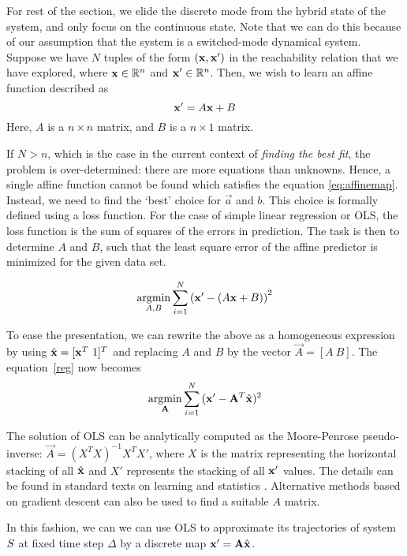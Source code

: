 For rest of the section, we elide the discrete mode from the hybrid
state of the system, and only focus on the continuous state. Note that
we can do this because of our assumption that the system is a
switched-mode dynamical system.  Suppose we have $N$ tuples of the
form $(\mathbf{x},\mathbf{x}')$ in the reachability relation that we have explored,
where $\mathbf{x}\in\mathbb{R}^n$ and $\mathbf{x}'\in\mathbb{R}^n$. Then, we wish to learn an
affine function described as 
\begin{equation}
\label{eq:affinemap}
\mathbf{x}' = A\mathbf{x} + B
\end{equation}
Here, $A$ is a $n\times n$ matrix, and $B$ is a $n\times 1$ matrix.


If $N>n$, which is the case in the current context of \textit{finding
the best fit}, the problem is over-determined: there are more
equations than unknowns. Hence, a single affine function cannot be
found which satisfies the equation \eqref{eq:affinemap}. Instead, we
need to find the `best' choice for $\vec{a}$ and $b$. This choice is
formally defined using a loss function. For the case of simple linear
regression or OLS, the loss function is the sum of squares of the
errors in prediction.  The task is then to determine $A$ and $B$, such
that the least square error of the affine predictor is minimized for
the given data set.

\begin{equation}
    \operatornamewithlimits{argmin}_{A,B}\displaystyle\sum_{i=1}^{N}{\left(\x' - (A\x + B)\right)^2}
\label{reg}
\end{equation}

To ease the presentation, we can rewrite the above as a homogeneous
expression by using $\hat{\x} = [\x^T\ 1]^T$ and replacing $A$ and $B$ by the vector
$\vec{A} = [A\ B]$. The equation~\ref{reg} now becomes
\[
\operatornamewithlimits{argmin}_{\vec{A}}\displaystyle\sum_{i=1}^{N}{(\x' - \vec{A}^T \hat{\x})^2}
\]

The solution of OLS can be analytically computed as the Moore-Penrose
pseudo-inverse: $\vec{A} = (X^TX)^{-1}X^T X'$, where $X$ is the matrix
representing the horizontal stacking of all $\hat{\mathbf{x}}$ and $X'$
represents the stacking of all $\mathbf{x}'$ values.  The details can be found
in standard texts on learning and statistics
\cite{friedman2001elements}. Alternative methods based on gradient
descent can also be used to find a suitable $A$ matrix.

In this fashion, we can we can use OLS to approximate its trajectories
of system $S$ at fixed time step $\Delta$ by a discrete map $\mathbf{x}'
= \mathbf{A}\hat{\mathbf{x}}$.

